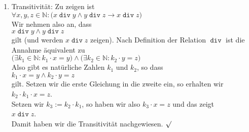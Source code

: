 \begin{enumerate}
      \\[0.2cm]
      \hspace*{1.3cm}
      $k_1 \cdot x = y \wedge k_2 \cdot y = x$
      \\[0.2cm]
      gilt.  Setzen wir diese Gleichungen ineinander ein, so erhalten wir 
      \\[0.2cm]
      \hspace*{1.3cm}
      $k_1 \cdot k_2 \cdot y = y$ \quad und \quad
      $k_2 \cdot k_1 \cdot x = x$.
      \\[0.2cm] 
      Da $x$ und $y$ als nat\"{u}rliche Zahlen von $0$ verschieden sind, muss dannn
      \\[0.2cm]
      \hspace*{1.3cm}
      $k_1 \cdot k_2 = 1$
      \\[0.2cm]
      gelten.  Da aus $k_1 \cdot k_2 = 1$ sofort $k_1 = 1$ und $k_2 = 1$ folgt, denn auch $k_1$ und
      $k_2$ sind ja nat\"{u}rliche Zahlen, 
      k\"{o}nnen wir wegen der urspr\"{u}nglichen Gleichungen $k_1 \cdot x = y$ und $k_2 \cdot y = x$
      sofort auf $x = y$ schlie\3en.  Damit ist die Anti-Symmetrie gezeigt. $\surd$
\item Transitivit\"{a}t: Zu zeigen ist 
      \\[0.2cm]
      \hspace*{1.3cm}
      $\forall x, y, z \in \mathbb{N}:\bigl( x \mathop{\mathtt{div}} y \wedge y \mathop{\mathtt{div}} z \rightarrow x \mathop{\mathtt{div}} z\bigr)$
      \\[0.2cm] 
      Wir nehmen also an, dass 
      \\[0.2cm]
      \hspace*{1.3cm}
      $x \mathop{\mathtt{div}} y \wedge y \mathop{\mathtt{div}} z$
      \\[0.2cm]
      gilt (und werden $x \mathop{\mathtt{div}} z$ zeigen).  Nach Definition der Relation $\mathop{\mathtt{div}}$
      ist die Annahme \"{a}quivalent zu 
      \\[0.2cm]
      \hspace*{1.3cm}
      $\bigl(\exists k_1 \in \mathbb{N}: k_1 \cdot x = y \bigr) \wedge
       \bigl(\exists k_2 \in \mathbb{N}: k_2 \cdot y = z \bigr)$ 
      \\[0.2cm]
      Also gibt es nat\"{u}rliche Zahlen $k_1$ und $k_2$, so dass 
      \\[0.2cm]
      \hspace*{1.3cm}
      $k_1 \cdot x = y \wedge k_2 \cdot y = z$
      \\[0.2cm]
      gilt.  Setzen wir die erste Gleichung in die zweite  ein, so erhalten wir 
      \\[0.2cm]
      \hspace*{1.3cm}
      $k_2 \cdot k_1 \cdot x = z$.
      \\[0.2cm] 
      Setzen wir $k_3 := k_2 \cdot k_1$, so haben wir also $k_3 \cdot x = z$
      und das zeigt 
      \\[0.2cm]
      \hspace*{1.3cm}
      $x \mathop{\mathtt{div}} z$.
      \\[0.2cm]
      Damit haben wir die Transitivit\"{a}t nachgewiesen.  $\surd$
\end{enumerate}
